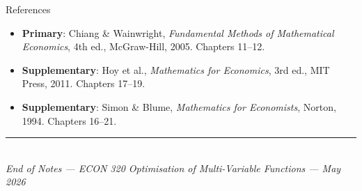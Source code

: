 \documentclass[12pt, a4paper]{article}
\theoremstyle{definition}
\begin{document}
\begin{keybox}{References}
\begin{itemize}
  \item \textbf{Primary}: Chiang \& Wainwright,
        \textit{Fundamental Methods of Mathematical Economics}, 4th ed.,
        McGraw-Hill, 2005. Chapters 11--12.
  \item \textbf{Supplementary}: Hoy et al.,
        \textit{Mathematics for Economics}, 3rd ed., MIT Press, 2011.
        Chapters 17--19.
  \item \textbf{Supplementary}: Simon \& Blume,
        \textit{Mathematics for Economists}, Norton, 1994.
        Chapters 16--21.
\end{itemize}
\end{keybox}

\vspace{1cm}
\begin{center}
  \textcolor{slate}{\rule{0.5\linewidth}{0.5pt}}\\[6pt]
  \textcolor{slate}{\small\itshape
    End of Notes --- ECON 320 Optimisation of Multi-Variable Functions
    --- May 2026}
\end{center}
\end{document}
